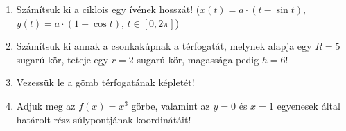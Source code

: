 \documentclass[a4paper, 12pt]{scrartcl}
\begin{document}
\begin{enumerate}
  \item Számítsuk ki a ciklois egy ívének hosszát! ($x(t) = a \cdot (t - \sin t)$,
        $y(t) = a \cdot (1 - \cos t)$, $t \in [0, 2\pi]$)

  \item Számítsuk ki annak a csonkakúpnak a térfogatát, melynek alapja egy
        $R = 5$ sugarú kör, teteje egy $r = 2$ sugarú kör, magassága pedig
        $h = 6$!

  \item Vezessük le a gömb térfogatának képletét!

  \item Adjuk meg az $f(x) = x^3$ görbe, valamint az $y = 0$ és $x = 1$
        egyenesek által határolt rész súlypontjának koordinátáit!
\end{enumerate}

\end{document}
